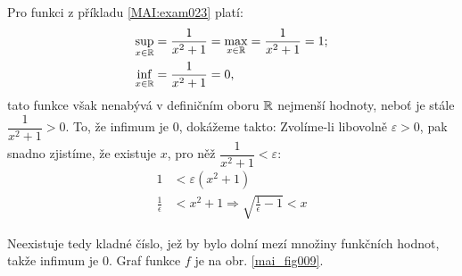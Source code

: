 \wikitextrule
\begin{example}\label{MAI:exam021} 
  Pro funkci z příkladu \ref{MAI:exam023} platí:
  \begin{align*}
    \sup_{x\in\mathbb{R}}&=\frac{1}{x^2+1}=\max_{x\in\mathbb{R}}=\frac{1}{x^2+1}=1;   \\
    \inf_{x\in\mathbb{R}}&=\frac{1}{x^2+1}=0,
  \end{align*}
  tato funkce však nenabývá v definičním oboru $\mathbb{R}$ nejmenší hodnoty, neboť je stále 
  $\dfrac{1}{x^2+1}>0$. To, že infimum je $0$, dokážeme takto: Zvolíme-li libovolně 
  $\varepsilon>0$, pak snadno zjistíme, že existuje $x$, pro něž 
  $\dfrac{1}{x^2+1}<\varepsilon$:
  \begin{align*}
    1                  &< \varepsilon(x^2+1) \\
    \frac{1}{\epsilon} &< x^2+1 \Rightarrow \sqrt{\frac{1}{\epsilon}-1} < x
  \end{align*} 
  
  {\centering
   \captionsetup{type=figure}
   
   \label{mai_fig009}
  \par}
  
  Neexistuje tedy kladné číslo, jež by bylo dolní mezí množiny funkčních hodnot, takže infimum je 
  $0$. Graf funkce $f$ je na obr. \ref{mai_fig009}.
\end{example}